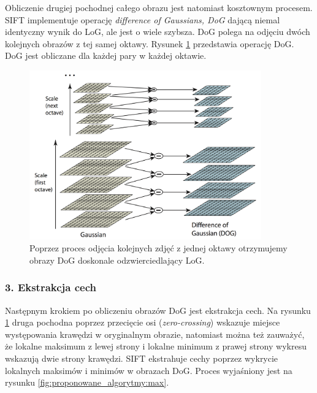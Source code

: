Obliczenie drugiej pochodnej całego obrazu jest natomiast kosztownym procesem. SIFT implementuje operację \textit{difference of Gaussians, DoG} dającą niemal identyczny wynik do LoG, ale jest o wiele szybsza. DoG polega na odjęciu dwóch kolejnych obrazów z tej samej oktawy. Rysunek \ref{fig:proponowane_algorytmy:dog} przedstawia operację DoG. DoG jest obliczane dla każdej pary w każdej oktawie.

\begin{figure}[htb]
  \centering
  \includegraphics[width=10cm]{gfx/dog}
  \caption{\cite{Lowe:2004:DIF:993451.996342} Poprzez proces odjęcia kolejnych zdjęć z jednej oktawy otrzymujemy obrazy DoG doskonale odzwierciedlający LoG.}
  \label{fig:proponowane_algorytmy:dog}
\end{figure}

\subsubsection{3. Ekstrakcja cech}
\label{sec:proponowane_algorytmy:ekstrakcja_cech}

Następnym krokiem po obliczeniu obrazów DoG jest ekstrakcja cech. Na rysunku \ref{fig:proponowane_algorytmy:dog} druga pochodna poprzez przecięcie osi (\textit{zero-crossing}) wskazuje miejsce występowania krawędzi w oryginalnym obrazie, natomiast można też zauważyć, że lokalne maksimum z lewej strony i lokalne minimum z prawej strony wykresu wskazują dwie strony krawędzi. SIFT ekstrahuje cechy poprzez wykrycie lokalnych maksimów i minimów w obrazach DoG. Proces wyjaśniony jest na rysunku \ref{fig:proponowane_algorytmy:max}.

